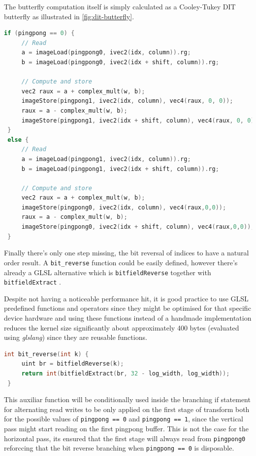 \documentclass[
  oneside,
  11pt, a4paper,
  footinclude=true,
  headinclude=true,
  cleardoublepage=empty
]{scrbook}
\begin{document}
The butterfly computation itself is simply calculated as a Cooley-Tukey DIT butterfly as illustrated in \autoref{fig:dit-butterfly}.

\begin{lstlisting}[language=C]
 if (pingpong == 0) {
     // Read
     a = imageLoad(pingpong0, ivec2(idx, column)).rg;
     b = imageLoad(pingpong0, ivec2(idx + shift, column)).rg;

     // Compute and store
     vec2 raux = a + complex_mult(w, b);
     imageStore(pingpong1, ivec2(idx, column), vec4(raux, 0, 0));
     raux = a - complex_mult(w, b);
     imageStore(pingpong1, ivec2(idx + shift, column), vec4(raux, 0, 0));
 }
 else {
     // Read
     a = imageLoad(pingpong1, ivec2(idx, column)).rg;
     b = imageLoad(pingpong1, ivec2(idx + shift, column)).rg;
     
     // Compute and store
     vec2 raux = a + complex_mult(w, b);
     imageStore(pingpong0, ivec2(idx, column), vec4(raux,0,0));    
     raux = a - complex_mult(w, b);
     imageStore(pingpong0, ivec2(idx + shift, column), vec4(raux,0,0));
 }
\end{lstlisting}

Finally there's only one step missing, the bit reversal of indices to have a natural order result. A \texttt{bit\_reverse} function could be easily defined, however there's already a GLSL alternative which is \texttt{bitfieldReverse} together with \texttt{bitfieldExtract} \cite{kessenich4opengl}.

Despite not having a noticeable performance hit, it is good practice to use GLSL predefined functions and operators since they might be optimised for that specific device hardware and using these functions instead of a handmade implementation reduces the kernel size significantly about approximately 400 bytes (evaluated using \textit{glslang}) since they are reusable functions. 

\begin{lstlisting}[language=C]
 int bit_reverse(int k) {
     uint br = bitfieldReverse(k);
     return int(bitfieldExtract(br, 32 - log_width, log_width));
 }
\end{lstlisting}

This auxiliar function will be conditionally used inside the branching if statement for alternating read writes to be only applied on the first stage of transform both for the possible values of \texttt{pingpong == 0} and \texttt{pingpong == 1}, since the vertical pass might start reading on the first pingpong buffer. This is not the case for the horizontal pass, its ensured that the first stage will always read from \texttt{pingpong0} reforccing that the bit reverse branching when \texttt{pingpong == 0} is disposable.
\end{document}

